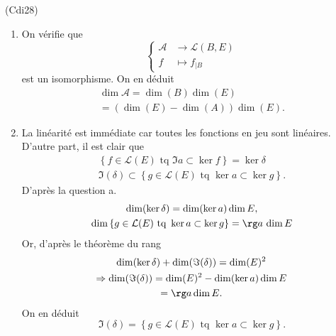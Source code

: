 \begin{tiny}(Cdi28)\end{tiny} 
\begin{enumerate}
 \item On vérifie que 
\[
 \left\lbrace 
 \begin{aligned}
  \mathcal{A} &\rightarrow \mathcal{L}(B,E)\\
  f &\mapsto f_{|B}
 \end{aligned}
\right. 
\]
est un isomorphisme. On en déduit 
\begin{multline*}
\dim \mathcal{A} = \dim(B) \dim(E)\\
= (\dim(E) - \dim(A))\dim(E). 
\end{multline*}


 \item La linéarité est immédiate car toutes les fonctions en jeu sont linéaires. D'autre part, il est clair que
\begin{multline*}
  \left\lbrace f\in \mathcal{L}(E) \text{ tq } \Im a \subset \ker f\right\rbrace = \ker \delta\\
  \Im(\delta) \subset \left\lbrace g\in \mathcal{L}(E) \text{ tq } \ker a \subset \ker g\right\rbrace.  
\end{multline*}
D'après la question a.
\begin{multline*}
 \dim(\ker \delta) = \dim(\ker a)\dim E, \\
 \dim \left\lbrace g\in \mathcal{L}(E) \text{ tq } \ker a \subset \ker g\right\rbrace = \rg a\,\dim E 
\end{multline*}
Or, d'après le théorème du rang 
\begin{multline*}
 \dim(\ker \delta) + \dim (\Im(\delta)) = \dim(E)^2\\
 \Rightarrow 
\dim (\Im(\delta)) =  \dim(E)^2 - \dim(\ker a)\dim E\\
= \rg a \dim E.
\end{multline*}
On en déduit 
\[
 \Im(\delta) = \left\lbrace g\in \mathcal{L}(E) \text{ tq } \ker a \subset \ker g\right\rbrace.
\]

\end{enumerate}

